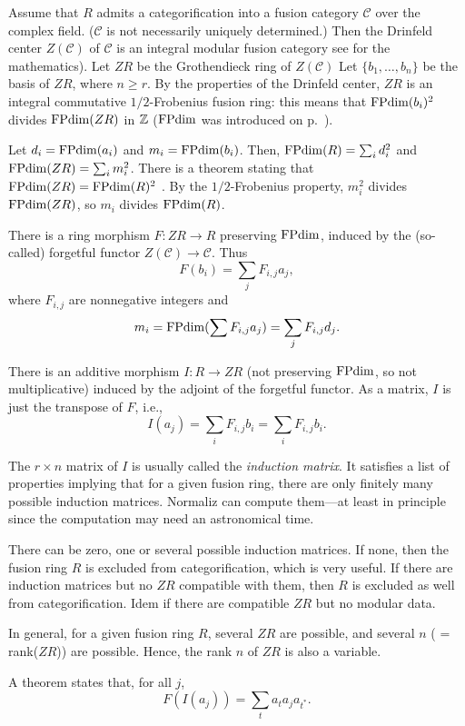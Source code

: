 Assume that $R$ admits a categorification into a fusion category $\mathcal{C}$ over the complex field. ($\mathcal{C}$ is not necessarily uniquely determined.) Then the Drinfeld center $Z(\mathcal{C})$ of $\mathcal{C}$ is an integral modular fusion category see \cite[Section 9.2]{EGNO} for the mathematics). Let $ZR$ be the Grothendieck ring of $Z(\mathcal{C})$ Let $\{b_1, \ldots, b_n\}$ be the basis of $ZR$, where $n \geq r$. By the properties of the Drinfeld center, $ZR$ is an integral commutative $1/2$-Frobenius fusion ring: this means that $\operatorname{FPdim}(b_i)^2$ divides $\operatorname{FPdim}(ZR)$ in ${\mathbb Z}$ ($\operatorname{FPdim}$ was introduced on p.~\pageref{FPdim}).

Let $d_i = \operatorname{FPdim}(a_i)$ and $m_i = \operatorname{FPdim}(b_i)$. Then, $\operatorname{FPdim}(R) = \sum_i d_i^2$ and $\operatorname{FPdim}(ZR) = \sum_i m_i^2$. There is a theorem stating that $\operatorname{FPdim}(ZR) = \operatorname{FPdim}(R)^2$ \cite[Thm. 7.16.6]{EGNO}. By the $1/2$-Frobenius property, $m_i^2$ divides $\operatorname{FPdim}(ZR)$, so $m_i$ divides $\operatorname{FPdim}(R)$.

There is a ring morphism $F: ZR \to R$ preserving $\operatorname{FPdim}$, induced by the (so-called) forgetful functor $Z(\mathcal{C}) \to \mathcal{C}$. Thus
\[ F(b_i) = \sum_j F_{i,j} a_j, \]
where $F_{i,j}$ are nonnegative integers and
\[ m_i = \operatorname{FPdim}(\sum F_{i,j} a_j) = \sum_j F_{i,j}d_j. \]

There is an additive morphism $I: R \to ZR$ (not preserving $\operatorname{FPdim}$, so not multiplicative) induced by the adjoint of the forgetful functor. As a matrix, $I$ is just the transpose of $F$, i.e.,
\[ I(a_j) = \sum_i F_{i,j} b_i = \sum_i F_{i,j} b_i. \]

The $r \times n$ matrix of $I$ is usually called the \emph{induction matrix}. It satisfies a list of properties implying that for a given fusion ring, there are only finitely many possible induction matrices. Normaliz can compute them---at least in principle since the computation may need an astronomical time.

There can be zero, one or several possible induction matrices. If none, then the fusion ring $R$ is excluded from categorification, which is very useful. If there are induction matrices but no $ZR$ compatible with them, then $R$ is excluded as well from categorification. Idem if there are compatible $ZR$ but no modular data. 

In general, for a given fusion ring $R$, several $ZR$ are possible, and several $n$ ( = rank($ZR$)) are possible. Hence, the rank $n$ of $ZR$ is also a variable.

A theorem \cite[Prop. 9.2.2]{EGNO} states that, for all $j$,
\[ F(I(a_j)) = \sum_t a_t a_j a_{t^*}. \]

